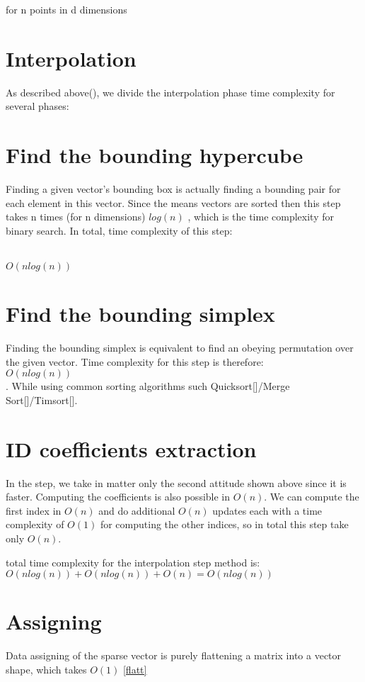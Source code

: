     for n points in d dimensions
	






\section{Interpolation}

As described above(), we divide the interpolation phase time complexity for several phases:




\section{Find the bounding hypercube}

Finding a given vector’s bounding box is actually finding a bounding pair for each element in this vector. Since the means vectors are sorted then this step takes n times (for n dimensions) $log(n)$ , which is the time complexity for binary search.
In total, time complexity of this step:  

\\
\textbf{$O(nlog(n))$}
\\


\section{Find the bounding simplex}


Finding the bounding simplex is equivalent to find an obeying permutation over the given vector.
Time complexity for this step is therefore: \\$O(nlog(n))$\\. While using common sorting algorithms such Quicksort[]/Merge Sort[]/Timsort[].








\section{ID coefficients extraction}

In the step, we take in matter only the second attitude shown above since it is faster.
Computing the coefficients is also possible in $O(n)$.
We can compute the first index in $O(n)$ and do additional $O(n)$ updates each with a time complexity of $O(1)$ for computing the other indices, so in total this step take only $O(n)$.

total time complexity for the interpolation step method is: \\

$ O(nlog(n)) + O(nlog(n)) + O(n) = O(nlog(n)) $





\section{Assigning}

Data assigning of the sparse vector is purely flattening a matrix into a vector shape, which takes $O(1)$ \ref{flatt}


